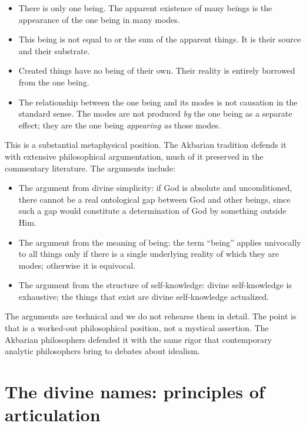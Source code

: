 \begin{itemize}[leftmargin=2em]
    \item There is only one being. The apparent existence of many
    beings is the appearance of the one being in many modes.
    \item This being is not equal to or the sum of the apparent
    things. It is their source and their substrate.
    \item Created things have no being of their own. Their reality is
    entirely borrowed from the one being.
    \item The relationship between the one being and its modes is
    not causation in the standard sense. The modes are not produced
    \emph{by} the one being as a separate effect; they are the one
    being \emph{appearing as} those modes.
\end{itemize}

This is a substantial metaphysical position. The Akbarian tradition
defends it with extensive philosophical argumentation, much of it
preserved in the commentary literature. The arguments include:

\begin{itemize}[leftmargin=2em]
    \item The argument from divine simplicity: if God is absolute and
    unconditioned, there cannot be a real ontological gap between
    God and other beings, since such a gap would constitute a
    determination of God by something outside Him.
    \item The argument from the meaning of being: the term
    ``being'' applies univocally to all things only if there is a
    single underlying reality of which they are modes; otherwise it
    is equivocal.
    \item The argument from the structure of self-knowledge: divine
    self-knowledge is exhaustive; the things that exist are divine
    self-knowledge actualized.
\end{itemize}

The arguments are technical and we do not rehearse them in detail.
The point is that  is a worked-out
philosophical position, not a mystical assertion. The Akbarian
philosophers defended it with the same rigor that contemporary
analytic philosophers bring to debates about idealism.

\section{The divine names: principles of articulation}
\label{sec:divine-names}

